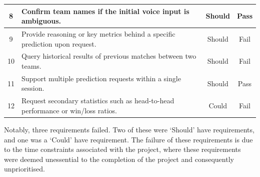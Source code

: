 {\begin{longtable}{@{} c >{\raggedright\arraybackslash}p{8.5cm} c c @{}}
    8 & Confirm team names if the initial voice input is ambiguous. & Should & Pass \\
    \midrule
    
    9 & Provide reasoning or key metrics behind a specific prediction upon request. & Should & Fail \\
    \midrule
    
    10 & Query historical results of previous matches between two teams. & Should & Fail \\
    \midrule
    
    11 & Support multiple prediction requests within a single session. & Should & Pass \\
    \midrule
    
    12 & Request secondary statistics such as head-to-head performance or win/loss ratios. & Could & Fail \\

\end{longtable}
}

Notably, three requirements failed. Two of these were `Should' have requirements, and one was a `Could' have requirement. The failure of these requirements is due to the time constraints associated with the project, where these requirements were deemed unessential to the completion of the project and consequently unprioritised.